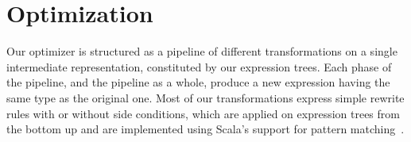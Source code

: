 \section{Optimization}
%

\label{subsec:transf}

Our optimizer is structured as a pipeline of different transformations on a single intermediate representation, constituted by our expression trees.
Each phase of the pipeline, and the pipeline as a whole, produce a new expression having the same type as the original one.
Most of our transformations express simple rewrite rules with or without side conditions, which are applied on expression trees from the bottom up and are implemented using Scala's support for pattern matching~\citep{Emir07Patterns}.



